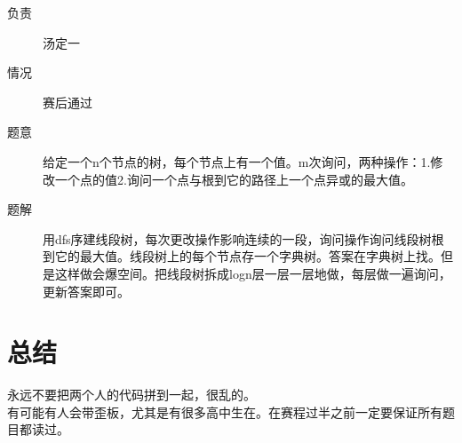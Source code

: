 \documentclass[a4paper, 11pt, nofonts, nocap, fancyhdr]{ctexart}
\begin{document}
\begin{description}
\item[负责] 汤定一
\item[情况] 赛后通过
\item[题意]
给定一个n个节点的树，每个节点上有一个值。m次询问，两种操作：1.修改一个点的值2.询问一个点与根到它的路径上一个点异或的最大值。
\item[题解]
用dfs序建线段树，每次更改操作影响连续的一段，询问操作询问线段树根到它的最大值。线段树上的每个节点存一个字典树。答案在字典树上找。但是这样做会爆空间。把线段树拆成logn层一层一层地做，每层做一遍询问，更新答案即可。
\end{description}

\section{总结}

永远不要把两个人的代码拼到一起，很乱的。\\
有可能有人会带歪板，尤其是有很多高中生在。在赛程过半之前一定要保证所有题目都读过。
\end{document}
